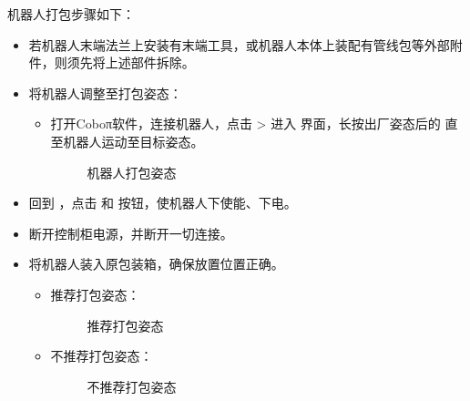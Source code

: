 \documentclass[a4paper,11pt,english,openany,oneside]{sphinxmanual}
\begin{document}
\sphinxAtStartPar
机器人打包步骤如下：
\begin{itemize}
\item {} 
\sphinxAtStartPar
若机器人末端法兰上安装有末端工具，或机器人本体上装配有管线包等外部附件，则须先将上述部件拆除。

\item {} 
\sphinxAtStartPar
将机器人调整至打包姿态：
\begin{itemize}
\item {} 
\sphinxAtStartPar
打开Coboπ软件，连接机器人，点击  >  进入  界面，长按出厂姿态后的  直至机器人运动至目标姿态。

\begin{figure}[H]
\centering
\capstart

\noindent{}
\caption{机器人打包姿态}\label{\detokenize{_u6253_u5305_u53ca_u8fd0_u8f93:id3}}\end{figure}

\end{itemize}

\item {} 
\sphinxAtStartPar
回到 ，点击  和  按钮，使机器人下使能、下电。

\item {} 
\sphinxAtStartPar
断开控制柜电源，并断开一切连接。

\item {} 
\sphinxAtStartPar
将机器人装入原包装箱，确保放置位置正确。
\begin{itemize}
\item {} 
\sphinxAtStartPar
推荐打包姿态：

\begin{figure}[H]
\centering
\capstart

\noindent{}
\caption{推荐打包姿态}\label{\detokenize{_u6253_u5305_u53ca_u8fd0_u8f93:id4}}\end{figure}

\item {} 
\sphinxAtStartPar
不推荐打包姿态：

\begin{figure}[H]
\centering
\capstart

\noindent{}
\caption{不推荐打包姿态}\label{\detokenize{_u6253_u5305_u53ca_u8fd0_u8f93:id5}}\end{figure}

\end{itemize}

\end{itemize}
\end{document}
